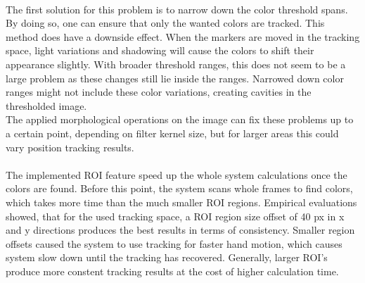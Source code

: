 \\The first solution for this problem is to narrow down the color threshold spans. By doing so, one can ensure that only the wanted colors are tracked. This method does have a downside effect. When the markers are moved in the tracking space, light variations and shadowing will cause the colors to shift their appearance slightly. With broader threshold ranges, this does not seem to be a large problem as these changes still lie inside the ranges. Narrowed down color ranges might not include these color variations, creating cavities in the thresholded image.\\ The applied morphological operations on the image can fix these problems up to a certain point, depending on filter kernel size, but for larger areas this could vary position tracking results.\\\\The implemented ROI feature speed up the whole system calculations once the colors are found. Before this point, the system scans whole frames to find colors, which takes more time than the much smaller ROI regions.
Empirical evaluations showed, that for the used tracking space, a ROI region size offset of 40 px in x and y directions produces the best results in terms of consistency. Smaller region offsets caused the system to use tracking for faster hand motion, which causes system slow down until the tracking has recovered. Generally, larger ROI's produce more constent tracking results at the cost of higher calculation time.
